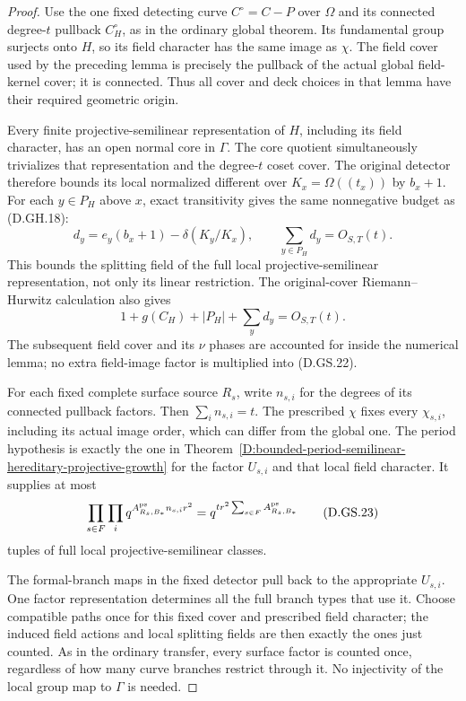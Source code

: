 \begin{proof}
Use the one fixed detecting curve
\(C^\circ=C-P\) over \(\Omega\) and its connected
degree-\(t\) pullback \(C_H^\circ\), as in the
ordinary global theorem. Its fundamental group
surjects onto \(H\), so its field character has
the same image as \(\chi\). The field cover used
by the preceding lemma is precisely the
pullback of the actual global field-kernel
cover; it is connected. Thus all cover and
deck choices in that lemma have their required
geometric origin.

Every finite projective-semilinear representation
of \(H\), including its field character, has an
open normal core in \(\Gamma\). The core quotient
simultaneously trivializes that representation
and the degree-\(t\) coset cover. The original
detector therefore bounds its local normalized
different over \(K_x=\Omega((t_x))\) by \(b_x+1\).
For each \(y\in P_H\) above \(x\), exact
transitivity gives the same nonnegative budget
as (D.GH.18):
\[
 d_y=e_y(b_x+1)-\delta(K_y/K_x),\qquad
 \sum_{y\in P_H}d_y=O_{S,T}(t).
                                                        \tag{D.GS.21}
\]
This bounds the splitting field of the full
local projective-semilinear representation,
not only its linear restriction.
The original-cover Riemann--Hurwitz calculation
also gives
\[
           1+g(C_H)+|P_H|+\sum_y d_y=O_{S,T}(t).
                                                        \tag{D.GS.22}
\]
The subsequent field cover and its \(\nu\) phases
are accounted for inside the numerical lemma;
no extra field-image factor is multiplied into
(D.GS.22).

For each fixed complete surface source \(R_s\),
write \(n_{s,i}\) for the degrees of its connected
pullback factors. Then \(\sum_i n_{s,i}=t\).
The prescribed \(\chi\) fixes every
\(\chi_{s,i}\), including its actual image
order, which can differ from the global one.
The period hypothesis is exactly the one in
Theorem~\ref{D:bounded-period-semilinear-hereditary-projective-growth}
for the factor \(U_{s,i}\) and that local
field character. It supplies at most
\[
 \prod_{s\in F}\prod_i
      q^{A^{\rm ps}_{R_s,B_*}n_{s,i}r^2}
       =q^{t r^2\sum_{s\in F}A^{\rm ps}_{R_s,B_*}}
                                                        \tag{D.GS.23}
\]
tuples of full local projective-semilinear classes.

The formal-branch maps in the fixed detector
pull back to the appropriate \(U_{s,i}\).
One factor representation determines all
the full branch types that use it.
Choose compatible paths once for this fixed
cover and prescribed field character; the
induced field actions and local splitting
fields are then exactly the ones just counted.
As in the ordinary transfer, every surface
factor is counted once, regardless of how
many curve branches restrict through it.
No injectivity of the local group map to
\(\Gamma\) is needed.


\end{proof}
